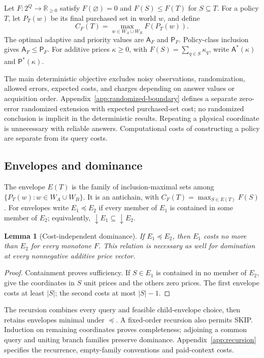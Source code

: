\documentclass[pdflatex,sn-mathphys-num]{sn-jnl}
\newcommand{\A}{\mathsf{A}}
\newcommand{\Pcost}{\mathsf{P}}
\newcommand{\down}{\mathop{\downarrow}}
\theoremstyle{thmstyleone}
\newtheorem{lemma}[theorem]{Lemma}
\theoremstyle{thmstylethree}
\theoremstyle{thmstyletwo}
\begin{document}
Let $F:2^Q\to\mathbb R_{\geq0}$ satisfy $F(\varnothing)=0$ and $F(S)\leq F(T)$ for $S\subseteq T$. For a policy $T$, let $P_T(w)$ be its final purchased set in world $w$, and define
\[
 C_F(T)=\max_{w\in W_A\cup W_B} F(P_T(w)).
\]
The optimal adaptive and priority values are $\A_F$ and $\Pcost_F$. Policy-class inclusion gives $\A_F\leq\Pcost_F$. For additive prices $\kappa\geq0$, with $F(S)=\sum_{q\in S}\kappa_q$, write $\A^*(\kappa)$ and $\Pcost^*(\kappa)$.

The main deterministic objective excludes noisy observations, randomization, allowed errors, expected costs, and charges depending on answer values or acquisition order. Appendix~\ref{app:randomized-boundary} defines a separate zero-error randomized extension with expected purchased-set cost; no randomized conclusion is implicit in the deterministic results. Repeating a physical coordinate is unnecessary with reliable answers. Computational costs of constructing a policy are separate from its query costs.

\subsection{Envelopes and dominance}\label{sec:envelopes}
The envelope $E(T)$ is the family of inclusion-maximal sets among $\{P_T(w):w\in W_A\cup W_B\}$. It is an antichain, with $C_F(T)=\max_{S\in E(T)}F(S)$. For envelopes write $E_1\preceq E_2$ if every member of $E_1$ is contained in some member of $E_2$; equivalently, $\down E_1\subseteq\down E_2$.

\begin{lemma}[Cost-independent dominance]\label{lem:dominance}
If $E_1\preceq E_2$, then $E_1$ costs no more than $E_2$ for every monotone $F$. This relation is necessary as well for domination at every nonnegative additive price vector.
\end{lemma}
\begin{proof}
Containment proves sufficiency. If $S\in E_1$ is contained in no member of $E_2$, give the coordinates in $S$ unit prices and the others zero prices. The first envelope costs at least $|S|$; the second costs at most $|S|-1$.
\end{proof}

The recursion combines every query and feasible child-envelope choice, then retains envelopes minimal under $\preceq$. A fixed-order recursion also permits SKIP. Induction on remaining coordinates proves completeness; adjoining a common query and uniting branch families preserve dominance. Appendix~\ref{app:recursion} specifies the recurrence, empty-family conventions and paid-context costs.
\end{document}
